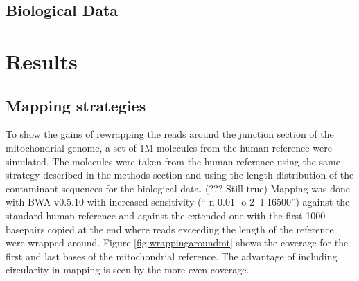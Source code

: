 \documentclass[a4paper,12pt]{article}
\begin{document}
\subsection{Biological Data}

% 


\clearpage
























\section{Results}


\subsection{Mapping strategies}

To show the gains of rewrapping the reads around the junction section of the mitochondrial genome, a set of 1M molecules from the human reference were simulated. The molecules were taken from the human reference using the same strategy described in the methods section and using the length distribution of the contaminant sequences for the biological data. (??? Still true) Mapping was done with BWA v0.5.10 with increased sensitivity (``-n 0.01 -o 2 -l 16500'') against the standard human reference and against the extended one with the first 1000 basepairs copied at the end where reads exceeding the length of the reference were wrapped around. Figure \ref{fig:wrappingaroundmt} shows the coverage for the first and last bases of the mitochondrial reference. The advantage of including circularity in mapping is seen by the more even coverage. 
\end{document}
